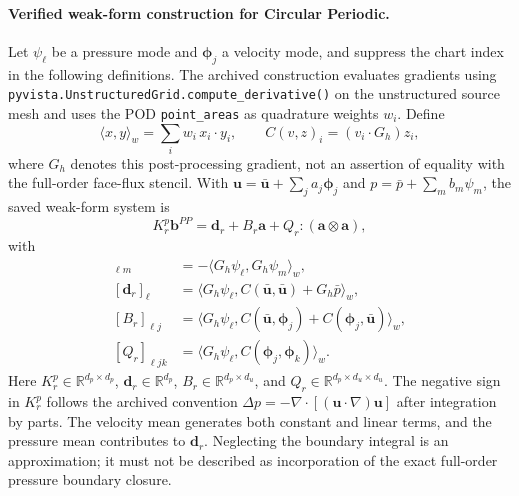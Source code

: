 \paragraph{Verified weak-form construction for Circular Periodic.}
Let $\psi_\ell$ be a pressure mode and $\bm\phi_j$ a velocity mode, and suppress the chart index in the following definitions. The archived construction evaluates gradients using \texttt{pyvista.UnstructuredGrid.compute\_derivative()} on the unstructured source mesh and uses the POD \texttt{point\_areas} as quadrature weights $w_i$. Define
\begin{equation}
 \langle x,y\rangle_w=\sum_i w_i\,x_i\cdot y_i,
 \qquad
 C(v,z)_i=(v_i\cdot G_h)z_i ,
\end{equation}
where $G_h$ denotes this post-processing gradient, not an assertion of equality with the full-order face-flux stencil. With $\bm u=\bar{\bm u}+\sum_j a_j\bm\phi_j$ and $p=\bar p+\sum_m b_m\psi_m$, the saved weak-form system is
\begin{equation}
 K_r^p\bm b^{PP}=\bm d_r+B_r\bm a+Q_r:(\bm a\otimes\bm a),
 \label{eq:app_pressure_poisson_system}
\end{equation}
with
\begin{align}
 [K_r^p]_{\ell m}&=-\langle G_h\psi_\ell,G_h\psi_m\rangle_w,
 \label{eq:app_ppe_K_definition}\\
 [\bm d_r]_\ell&=\langle G_h\psi_\ell,C(\bar{\bm u},\bar{\bm u})+G_h\bar p\rangle_w,
 \label{eq:app_ppe_d_definition}\\
 [B_r]_{\ell j}&=\langle G_h\psi_\ell,C(\bar{\bm u},\bm\phi_j)+C(\bm\phi_j,\bar{\bm u})\rangle_w,
 \label{eq:app_ppe_B_definition}\\
 [Q_r]_{\ell jk}&=\langle G_h\psi_\ell,C(\bm\phi_j,\bm\phi_k)\rangle_w.
 \label{eq:app_ppe_Q_definition}
\end{align}
Here $K_r^p\in\mathbb R^{d_p\times d_p}$, $\bm d_r\in\mathbb R^{d_p}$, $B_r\in\mathbb R^{d_p\times d_u}$, and $Q_r\in\mathbb R^{d_p\times d_u\times d_u}$. The negative sign in $K_r^p$ follows the archived convention $\Delta p=-\nabla\cdot[(\bm u\cdot\nabla)\bm u]$ after integration by parts. The velocity mean generates both constant and linear terms, and the pressure mean contributes to $\bm d_r$. Neglecting the boundary integral is an approximation; it must not be described as incorporation of the exact full-order pressure boundary closure.

